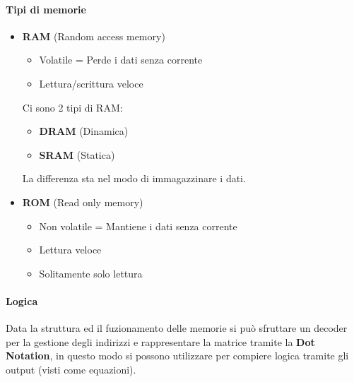 \documentclass{article}
\begin{document}
\paragraph{Tipi di memorie}

\begin{itemize}

    \item \textbf{RAM} (Random access memory)
        \begin{itemize}
            \item Volatile = Perde i dati senza corrente
            \item Lettura/scrittura veloce
        \end{itemize}

        Ci sono 2 tipi di RAM:
        \begin{itemize}
            \item \textbf{DRAM} (Dinamica)
            \item \textbf{SRAM} (Statica)
        \end{itemize}

        La differenza sta nel modo di immagazzinare i dati.
    
    \item \textbf{ROM} (Read only memory)
        \begin{itemize}
            \item Non volatile = Mantiene i dati senza corrente
            \item Lettura veloce
            \item Solitamente solo lettura
        \end{itemize}
\end{itemize}

\paragraph{Logica}

Data la struttura ed il fuzionamento delle memorie si può sfruttare un decoder per la gestione degli indirizzi e rappresentare la matrice tramite la \textbf{Dot Notation}, in questo modo si possono utilizzare per compiere logica tramite gli output (visti come equazioni).
\end{document}
